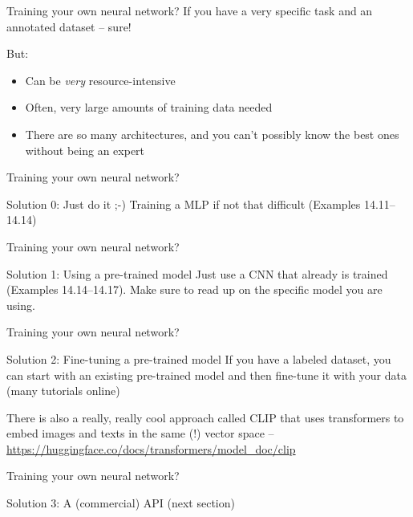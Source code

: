 \begin{frame}{Training your own neural network?}
  If you have a very specific task and an annotated dataset -- sure!

  But:
  \begin{itemize}
  \item Can be \emph{very} resource-intensive
  \item Often, very large amounts of training data needed
  \item There are so many architectures, and you can't possibly know the best ones without being an expert
  \end{itemize}
\end{frame}


\begin{frame}{Training your own neural network?}
  \begin{block}{Solution 0: Just do it ;-)}
Training a MLP if not that difficult (Examples 14.11--14.14)
  \end{block}
\end{frame}



\begin{frame}{Training your own neural network?}
  \begin{block}{Solution 1: Using a pre-trained model}
Just use a CNN that already is trained (Examples 14.14--14.17). Make sure to read up on the specific model you are using.
  \end{block}
\end{frame}

\begin{frame}{Training your own neural network?}
  \begin{block}{Solution 2: Fine-tuning a pre-trained model}
If you have a labeled dataset, you can start with an existing pre-trained model and then fine-tune it with your data (many tutorials online)
  \end{block}

  There is also a really, really cool approach called CLIP that uses transformers to embed images and texts in the same  (!) vector space \parencite{radford2021clip} -- \tiny{\url{https://huggingface.co/docs/transformers/model_doc/clip}}

\end{frame}


\begin{frame}{Training your own neural network?}
  \begin{block}{Solution 3: A (commercial) API}
    (next section)
  \end{block}
\end{frame}


